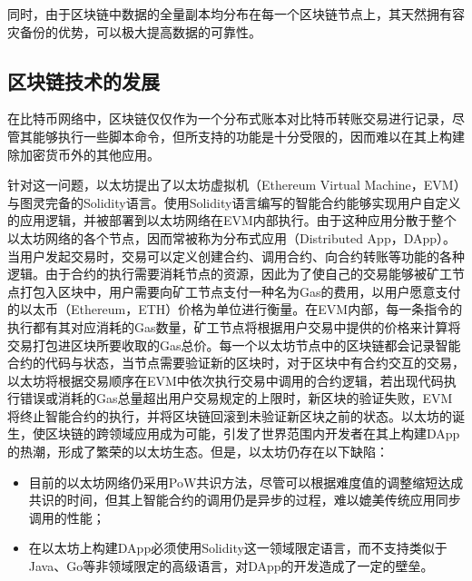     同时，由于区块链中数据的全量副本均分布在每一个区块链节点上，其天然拥有容灾备份的优势，可以极大提高数据的可靠性。

    \subsection{区块链技术的发展}
    \label{survey:blockchain:development}
    在比特币网络中，区块链仅仅作为一个分布式账本对比特币转账交易进行记录，尽管其能够执行一些脚本命令，但所支持的功能是十分受限的，因而难以在其上构建除加密货币外的其他应用。

    针对这一问题，以太坊\cite{wood2014ethereum}提出了以太坊虚拟机（Ethereum Virtual Machine，EVM）与图灵完备的Solidity语言。使用Solidity语言编写的智能合约能够实现用户自定义的应用逻辑，并被部署到以太坊网络在EVM内部执行。由于这种应用分散于整个以太坊网络的各个节点，因而常被称为分布式应用（Distributed App，DApp）。当用户发起交易时，交易可以定义创建合约、调用合约、向合约转账等功能的各种逻辑。由于合约的执行需要消耗节点的资源，因此为了使自己的交易能够被矿工节点打包入区块中，用户需要向矿工节点支付一种名为Gas的费用，以用户愿意支付的以太币（Ethereum，ETH）价格为单位进行衡量。在EVM内部，每一条指令的执行都有其对应消耗的Gas数量，矿工节点将根据用户交易中提供的价格来计算将交易打包进区块所要收取的Gas总价。每一个以太坊节点中的区块链都会记录智能合约的代码与状态，当节点需要验证新的区块时，对于区块中有合约交互的交易，以太坊将根据交易顺序在EVM中依次执行交易中调用的合约逻辑，若出现代码执行错误或消耗的Gas总量超出用户交易规定的上限时，新区块的验证失败，EVM将终止智能合约的执行，并将区块链回滚到未验证新区块之前的状态。以太坊的诞生，使区块链的跨领域应用成为可能，引发了世界范围内开发者在其上构建DApp的热潮，形成了繁荣的以太坊生态。但是，以太坊仍存在以下缺陷：
    \begin{itemize}
      \item 目前的以太坊网络仍采用PoW共识方法，尽管可以根据难度值的调整缩短达成共识的时间，但其上智能合约的调用仍是异步的过程，难以媲美传统应用同步调用的性能；
      \item 在以太坊上构建DApp必须使用Solidity这一领域限定语言，而不支持类似于Java、Go等非领域限定的高级语言，对DApp的开发造成了一定的壁垒。
    \end{itemize}

